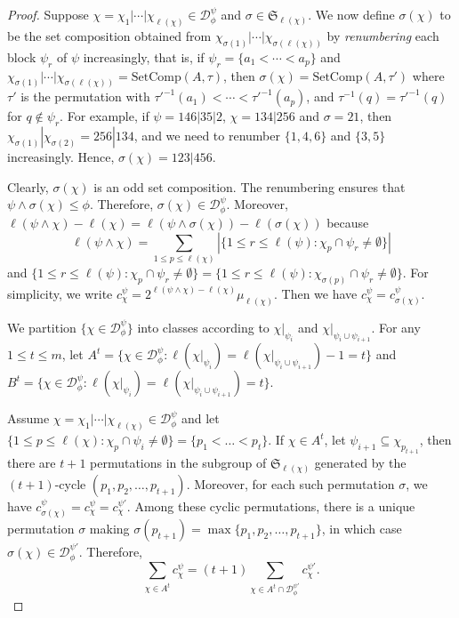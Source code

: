 \documentclass[11pt]{amsart}
\numberwithin{equation}{section}
\newcommand{\SetComp}{\mathrm{SetComp}}
\begin{document}
\begin{proof}
	Suppose $\chi=\chi_1|\cdots|\chi_{\ell(\chi)}\in\mathscr{D}_\phi^\psi$ and $\sigma\in\mathfrak{S}_{\ell(\chi)}$. We now define $\sigma(\chi)$ to be the set composition obtained from $\chi_{\sigma(1)}|\cdots|\chi_{\sigma({\ell(\chi)})}$ by \emph{renumbering} each block $\psi_r$ of $\psi$ increasingly, that is, if $\psi_r=\{a_1<\cdots<a_p\}$ and $\chi_{\sigma(1)}|\cdots|\chi_{\sigma({\ell(\chi)})}=\SetComp(A,\tau)$, then $\sigma(\chi)=\SetComp(A,\tau')$ where $\tau'$ is the permutation with $\tau'^{-1}(a_1)<\cdots<\tau'^{-1}(a_p)$, and $\tau^{-1}(q)=\tau'^{-1}(q)$ for $q\notin\psi_r$. For example, if $\psi=146|35|2$, $\chi=134|256$ and $\sigma=21$, then $\chi_{\sigma(1)}|\chi_{\sigma(2)}=256|134$, and we need to renumber $\{1,4,6\}$ and $\{3,5\}$ increasingly. Hence, $\sigma(\chi)=123|456$.
	
	Clearly, $\sigma(\chi)$ is an odd set composition. The renumbering ensures that $\psi\land\sigma(\chi)\leq\phi$. Therefore, $\sigma(\chi)\in\mathscr{D}_\phi^\psi$. Moreover, $\ell(\psi\land\chi)-\ell(\chi)=\ell(\psi\land\sigma(\chi))-\ell(\sigma(\chi))$ because 
	$$\ell(\psi\land\chi)=\sum_{1\leq p\leq {\ell(\chi)}}|\{1\leq r\leq {\ell(\psi)}:\chi_p\cap \psi_r\neq\emptyset\}|$$
	and $\{1\leq r\leq {\ell(\psi)}:\chi_p\cap \psi_r\neq\emptyset\}=\{1\leq r\leq {\ell(\psi)}:\chi_{\sigma(p)}\cap \psi_r\neq\emptyset\}$. For simplicity, we write $c_\chi^\psi=2^{\ell(\psi\land\chi)-\ell(\chi)}\mu_{\ell(\chi)}$. Then we have $c_\chi^\psi=c_{\sigma(\chi)}^\psi$.
	
	We partition $\{\chi\in\mathscr{D}_\phi^\psi\}$ into classes according to $\chi|_{\psi_i}$ and $\chi|_{\psi_i\cup \psi_{i+1}}$. For any $1\leq t\leq m$, let $A^t=\{\chi\in\mathscr{D}_\phi^\psi:\ell(\chi|_{\psi_i})=\ell(\chi|_{\psi_i\cup \psi_{i+1}})-1=t\}$ and $B^t=\{\chi\in\mathscr{D}_\phi^\psi:\ell(\chi|_{\psi_i})=\ell(\chi|_{\psi_i\cup \psi_{i+1}})=t\}$.
	
	Assume $\chi=\chi_1|\cdots|\chi_{\ell(\chi)}\in\mathscr{D}_\phi^\psi$ and let $\{1\leq p\leq {\ell(\chi)}:\chi_p\cap \psi_i\neq\emptyset\}=\{p_1<\dots<p_t\}$. If $\chi\in A^t$, let $\psi_{i+1}\subseteq \chi_{p_{t+1}}$, then there are $t+1$ permutations in the subgroup of $\mathfrak{S}_{\ell(\chi)}$ generated by the $(t+1)$-cycle $(p_1,p_2,\dots,p_{t+1})$. Moreover, for each such permutation $\sigma$, we have $c_{\sigma(\chi)}^\psi=c_\chi^\psi=c_\chi^{\psi'}$. Among these cyclic permutations, there is a unique permutation $\sigma$ making $\sigma(p_{t+1})=\max\{p_1,p_2,\dots,p_{t+1}\}$, in which case $\sigma(\chi)\in  \mathscr{D}_\phi^{\psi'}$. Therefore, $$\displaystyle\sum_{\chi\in A^t}c_\chi^\psi=(t+1)\sum_{\chi\in A^t\cap\mathscr{D}_\phi^{\psi'}}c_\chi^{\psi'}.$$
	

\end{proof}
\end{document}
